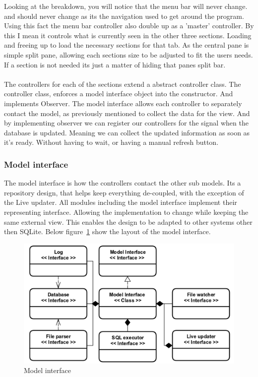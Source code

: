Looking at the breakdown, you will notice that the menu bar will never change. and should never change as its the navigation used to get around the program. Using this fact the menu bar controller also double up as a 'master' controller. By this I mean it controls what is currently seen in the other three sections. Loading and freeing up to load the necessary sections for that tab. As the central pane is simple split pane, allowing each sections size to be adjusted to fit the users needs. If a section is not needed its just a matter of hiding that panes split bar. 
\\\\
The controllers for each of the sections extend a abstract controller class. The controller class, enforces a model interface object into the constructor. And implements Observer. The model interface allows each controller to separately contact the model, as previously mentioned to collect the data for the view. And by implementing observer we can register our controllers for the signal when the database is updated. Meaning we can collect the updated information as soon as it's ready. Without having to wait, or having a manual refresh button.    

\subsubsection{Model interface}
\label{subsubsec:imp_model_interface}

The model interface is how the controllers contact the other sub models. Its a repository design, that helps keep everything de-coupled, with the exception of the Live updater. All modules including the model interface implement their representing interface. Allowing the implementation to change while keeping the same external view. This enables the design to be adapted to other systems other then SQLite. Below figure~\ref{fig:model_interface_design} show the layout of the model interface.

\begin{figure}[H]
	\centering
	\includegraphics[scale=0.3]{images/model_interface_design.png}
	\caption{Model interface}
	\label{fig:model_interface_design}
\end{figure}

